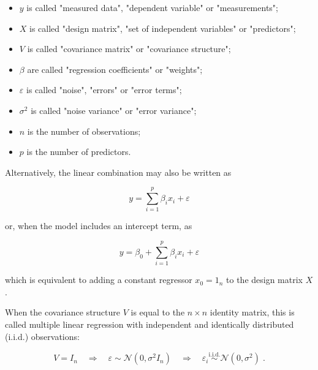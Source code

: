 \documentclass[a4paper,12pt,twoside]{book}
\begin{document}
\begin{itemize}

\item $y$ is called "measured data", "dependent variable" or "measurements";

\item $X$ is called "design matrix", "set of independent variables" or "predictors";

\item $V$ is called "covariance matrix" or "covariance structure";

\item $\beta$ are called "regression coefficients" or "weights";

\item $\varepsilon$ is called "noise", "errors" or "error terms";

\item $\sigma^2$ is called "noise variance" or "error variance";

\item $n$ is the number of observations;

\item $p$ is the number of predictors.

\end{itemize}

Alternatively, the linear combination may also be written as

\begin{equation} \label{eq:mlr-mlr-model-sum}
y = \sum_{i=1}^{p} \beta_i x_i + \varepsilon
\end{equation}

or, when the model includes an intercept term, as

\begin{equation} \label{eq:mlr-mlr-model-sum-base}
y = \beta_0 + \sum_{i=1}^{p} \beta_i x_i + \varepsilon
\end{equation}

which is equivalent to adding a constant regressor $x_0 = 1_n$ to the design matrix $X$.

When the covariance structure $V$ is equal to the $n \times n$ identity matrix, this is called multiple linear regression with independent and identically distributed (i.i.d.) observations:

\begin{equation} \label{eq:mlr-mlr-noise-iid}
V = I_n \quad \Rightarrow \quad \varepsilon \sim \mathcal{N}(0, \sigma^2 I_n) \quad \Rightarrow \quad \varepsilon_i \overset{\text{i.i.d.}}{\sim} \mathcal{N}(0, \sigma^2) \; .
\end{equation}
\end{document}
